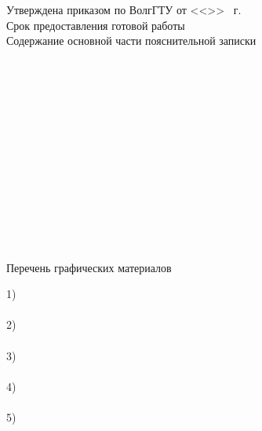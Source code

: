 \begin{titlepage}
    \vspace{0.5em}\hspace*{12mm}\underline{\hspace{0.93\textwidth}}\\
    \vspace{0.5em}\hspace*{12mm}\underline{\hspace{0.93\textwidth}}\\
    \vspace{1em}Утверждена приказом по ВолгГТУ от <<\LINE{1em}>> \underline{\hspace{4em}}
        \the\year\ г. \textnumero \LINE{7em}\\
    Срок предоставления готовой работы \\
    \vspace{.5em}Содержание основной части пояснительной записки\\
    \LINE{\textwidth}\\\LINE{\textwidth}\\\LINE{\textwidth}\\\LINE{\textwidth}\\\LINE{\textwidth}\\
    \LINE{\textwidth}\\\LINE{\textwidth}\\\LINE{\textwidth}\\\LINE{\textwidth}\\\LINE{\textwidth}\\
    \LINE{\textwidth}\\\LINE{\textwidth}\\\LINE{\textwidth}\\
    \newpage
    \thispagestyle{empty}
    \begin{center}
        Перечень графических материалов
    \end{center}
    1) \\\LINE{\textwidth}\\
    2) \\\LINE{\textwidth}\\
    3) \\\LINE{\textwidth}\\
    4) \\\LINE{\textwidth}\\
    5) \\\LINE{\textwidth}\\

\end{titlepage}
